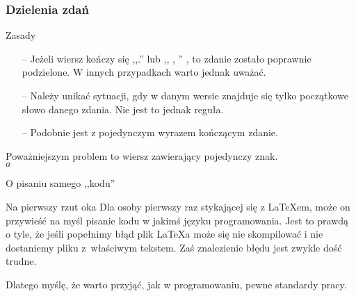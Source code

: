 \documentclass{beamer}  %
\begin{document}
\begin{frame}
  \frametitle{Dzielenia zdań}

  \begin{block}{Zasady}
    \begin{itemize}
    \item[--] Jeżeli wiersz kończy się ,,.'' lub ,, , '' , to zdanie
      zostało poprawnie podzielone. W innych przypadkach warto jednak
      uważać.
    \item[--] Należy unikać sytuacji, gdy w danym wersie znajduje się
      tylko początkowe słowo danego zdania. Nie jest to jednak reguła.
    \item[--] Podobnie jest z pojedynczym wyrazem kończącym zdanie.
    \end{itemize}
  \end{block}
  \pause

  \begin{block}{}
    Poważniejszym problem to wiersz zawierający pojedynczy
    znak. \\
    $a$
  \end{block}

\end{frame}



\begin{frame}{O pisaniu samego ,,kodu''}

  \begin{block}{Na pierwszy rzut oka}
    Dla osoby pierwszy raz stykającej się z \LaTeX em, może on
    przywieść na myśl pisanie kodu w jakimś języku programowania.
    \linebreak Jest to prawdą o tyle, że jeśli popełnimy błąd plik
    \LaTeX a może się nie skompilować i nie dostaniemy pliku
    z~właściwym tekstem. \linebreak Zaś znalezienie błędu jest zwykle
    dość trudne.
  \end{block}

  \begin{block}{}
    Dlatego myślę, że warto przyjąć, jak w programowaniu, pewne
    standardy pracy.
  \end{block}

\end{frame}
\end{document}
